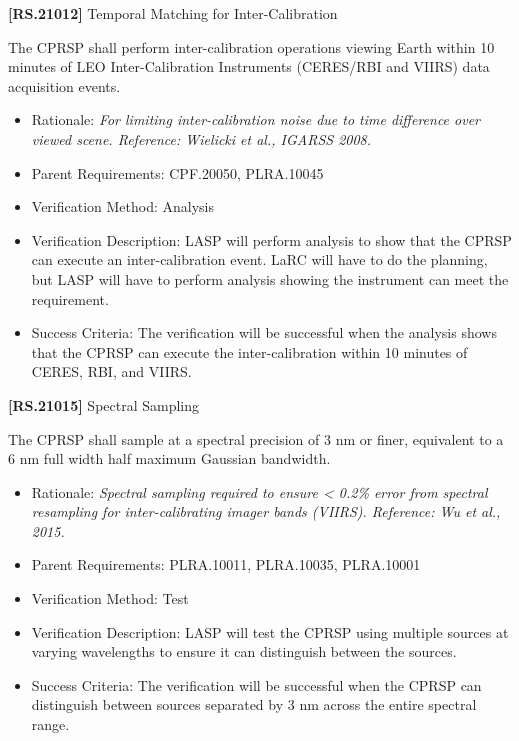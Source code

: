 \documentclass[12pt,oneside,oldfontcommands]{memoir}
\begin{document}
\textbf{[RS.21012]} Temporal Matching for Inter-Calibration

The \gls{CPRSP} shall perform inter-calibration operations viewing Earth within 10 minutes of \gls{LEO} Inter-Calibration Instruments (CERES\slash RBI and VIIRS) data acquisition events.

\begin{itemize}
\item{} Rationale: \emph{For limiting inter-calibration noise due to time difference over viewed scene. Reference: Wielicki et al., IGARSS 2008.}

\item{} Parent Requirements: \gls{CPF}.20050, PLRA.10045

\item{} Verification Method: Analysis

\item{} Verification Description: \gls{LASP} will perform \gls{analysis} to show that the \gls{CPRSP} can execute an inter-calibration event. \gls{LaRC} will have to do the planning, but \gls{LASP} will have to perform \gls{analysis} showing the instrument can meet the requirement.

\item{} Success Criteria: The verification will be successful when the \gls{analysis} shows that the \gls{CPRSP} can execute the inter-calibration within 10 minutes of \gls{CERES}, \gls{RBI}, and \gls{VIIRS}.

\end{itemize}

\textbf{[RS.21015]} Spectral Sampling

The \gls{CPRSP} shall \gls{sample} at a spectral precision of 3 nm or finer, equivalent to a 6 nm full width half maximum Gaussian bandwidth.

\begin{itemize}
\item{} Rationale: \emph{Spectral sampling required to ensure < 0.2\% error from spectral resampling for inter-calibrating imager bands (VIIRS). Reference: Wu et al., 2015.}

\item{} Parent Requirements: PLRA.10011, PLRA.10035, PLRA.10001

\item{} Verification Method: Test

\item{} Verification Description: \gls{LASP} will \gls{test} the \gls{CPRSP} using multiple sources at varying wavelengths to ensure it can distinguish between the sources.

\item{} Success Criteria: The verification will be successful when the \gls{CPRSP} can distinguish between sources separated by 3 nm across the entire spectral range.

\end{itemize}
\end{document}

